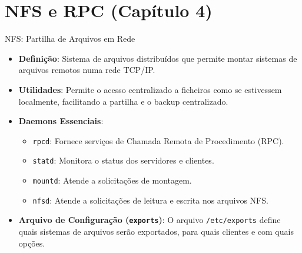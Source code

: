 \documentclass{beamer}
\begin{document}
	\section{NFS e RPC (Capítulo 4)}
	\begin{frame}{NFS: Partilha de Arquivos em Rede}
		\begin{itemize}
			\item \textbf{Definição}: Sistema de arquivos distribuídos que permite montar sistemas de arquivos remotos numa rede TCP/IP.
			\item \textbf{Utilidades}: Permite o acesso centralizado a ficheiros como se estivessem localmente, facilitando a partilha e o backup centralizado.
			\item \textbf{Daemons Essenciais}:
			\begin{itemize}
				\item \texttt{rpcd}: Fornece serviços de Chamada Remota de Procedimento (RPC).
				\item \texttt{statd}: Monitora o status dos servidores e clientes.
				\item \texttt{mountd}: Atende a solicitações de montagem.
				\item \texttt{nfsd}: Atende a solicitações de leitura e escrita nos arquivos NFS.
			\end{itemize}
			\item \textbf{Arquivo de Configuração (\texttt{exports})}: O arquivo \texttt{/etc/exports} define quais sistemas de arquivos serão exportados, para quais clientes e com quais opções.
		\end{itemize}
	\end{frame}
	
\end{document}
